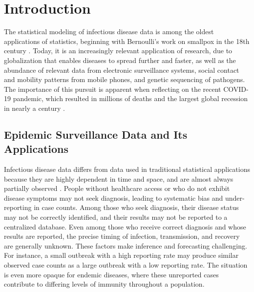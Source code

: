 \chapter{Introduction}
\label{ch:introduction}
\graphicspath{{figures/ch_1/}}

The statistical modeling of infectious disease data is among the oldest applications of statistics, beginning with Bernoulli's work on smallpox in the 18th century \citep{Bernoulli2004}.
Today, it is an increasingly relevant application of research, due to globalization that enables diseases to spread further and faster, as well as the abundance of relevant data from electronic surveillance systems, social contact and mobility patterns from mobile phones, and genetic sequencing of pathogens.
The importance of this pursuit is apparent when reflecting on the recent COVID-19 pandemic, which resulted in millions of deaths and the largest global recession in nearly a century \citep{whocoronavirus,  zumbrun_2020}.

\section{Epidemic Surveillance Data and Its Applications}
\label{ch_1:sec:epidemic_surveillance_data}

Infectious disease data differs from data used in traditional statistical applications because they are highly dependent in time and space, and are almost always partially observed \citep{held2019handbook}.
People without healthcare access or who do not exhibit disease symptoms may not seek diagnosis, leading to systematic bias and under-reporting in case counts.
Among those who seek diagnosis, their disease status may not be correctly identified, and their results may not be reported to a centralized database.
Even among those who receive correct diagnosis and whose results are reported, the precise timing of infection, transmission, and recovery are generally unknown.
These factors make inference and forecasting challenging.
For instance, a small outbreak with a high reporting rate may produce similar observed case counts as a large outbreak with a low reporting rate.
The situation is even more opaque for endemic diseases, where these unreported cases contribute to differing levels of immunity throughout a population.

